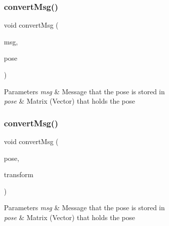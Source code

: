 \subsubsection{\texorpdfstring{convert\+Msg()}{convertMsg()}\hspace{0.1cm}{\footnotesize\ttfamily [9/14]}}
{\footnotesize\ttfamily void convert\+Msg (\begin{DoxyParamCaption}\item[{geometry\+\_\+msgs\+::\+Pose\+Stamped \&}]{msg,  }\item[{Eigen\+::\+Matrix$<$ double, 7, 1 $>$ \&}]{pose }\end{DoxyParamCaption})\hspace{0.3cm}{\ttfamily [inline]}}


\begin{DoxyParams}{Parameters}
{\em msg} & Message that the pose is stored in \\
\hline
{\em pose} & Matrix (Vector) that holds the pose \\
\hline
\end{DoxyParams}
\mbox{\label{group__MultiRobotController_ga45b2bbef58d2c60ff8eeb77d221f2ab7}} 
\subsubsection{\texorpdfstring{convert\+Msg()}{convertMsg()}\hspace{0.1cm}{\footnotesize\ttfamily [10/14]}}
{\footnotesize\ttfamily void convert\+Msg (\begin{DoxyParamCaption}\item[{geometry\+\_\+msgs\+::\+Pose \&}]{pose,  }\item[{geometry\+\_\+msgs\+::\+Transform \&}]{transform }\end{DoxyParamCaption})\hspace{0.3cm}{\ttfamily [inline]}}


\begin{DoxyParams}{Parameters}
{\em msg} & Message that the pose is stored in \\
\hline
{\em pose} & Matrix (Vector) that holds the pose \\
\hline
\end{DoxyParams}
\mbox{\label{group__MultiRobotController_gaf99f4d3d714176ee5a3d235ffabb7d3f}} 
